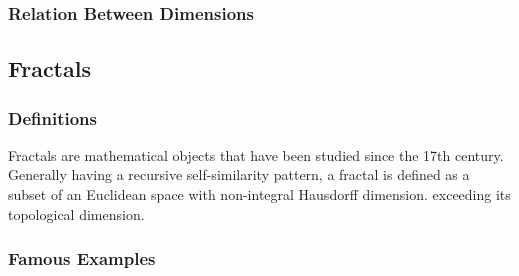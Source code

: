 \subsubsection{Relation Between Dimensions}

\subsection{Fractals}

\subsubsection{Definitions}
Fractals are mathematical objects that have been studied since the 17th century.
Generally having a recursive self-similarity pattern, a fractal is defined as a subset of an Euclidean space with non-integral Hausdorff dimension.
 exceeding its topological dimension.


\subsubsection{Famous Examples}

